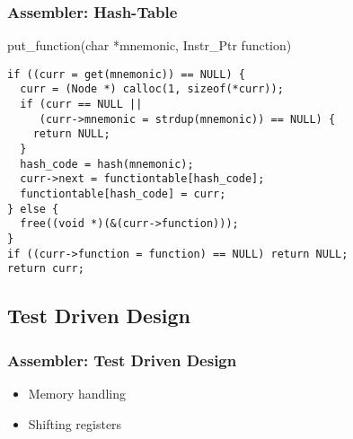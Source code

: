 \documentclass{beamer}
\begin{document}
\begin{frame}[fragile]
\frametitle{Assembler: Hash-Table}

\begin{block}{put\_function(char *mnemonic, Instr\_Ptr function)}
\begin{verbatim}
if ((curr = get(mnemonic)) == NULL) {
  curr = (Node *) calloc(1, sizeof(*curr));
  if (curr == NULL || 
     (curr->mnemonic = strdup(mnemonic)) == NULL) {
    return NULL;
  }
  hash_code = hash(mnemonic);
  curr->next = functiontable[hash_code];
  functiontable[hash_code] = curr;
} else {
  free((void *)(&(curr->function)));
}
if ((curr->function = function) == NULL) return NULL;
return curr;
\end{verbatim}
\end{block}

\end{frame}

\subsection{Test Driven Design}

\begin{frame}
\frametitle{Assembler: Test Driven Design}

\begin{itemize}
\item Memory handling
\item Shifting registers
\end{itemize}

\end{frame}
\end{document}
